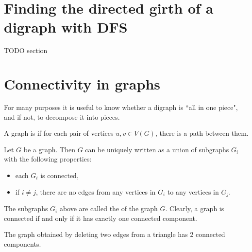 \section{Finding the directed girth of a digraph with DFS}
{\color{red}TODO section}


\section{Connectivity in graphs}

For many purposes it is useful to know whether a digraph is ``all in one
piece", and if not, to decompose it into pieces.


\begin{Definition} 
A graph is  if for each pair of 
vertices $u, v \in V(G)$, there is a path between them.
\end{Definition}

\begin{Theorem} \label{thm:components}
Let $G$ be a graph. Then $G$ can be uniquely written as a union of
subgraphs $G_i$ with the following properties:
\begin{itemize}
  \item each $G_i$ is connected,
  \item if $i \neq j$, there are no edges from any vertices in $G_i$ 
  to any vertices in $G_j$.
\end{itemize}
\end{Theorem}

The subgraphs $G_i$ above are called the  of the graph $G$. 
Clearly, a graph is connected if and only if it has exactly one connected component.

\begin{Boxample} \label{eg:components}
The graph obtained by deleting two edges from a triangle has 2 connected components.
\end{Boxample}


